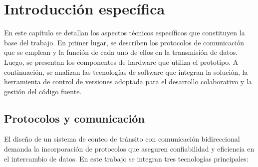 \chapter{Introducción específica} %

\label{Chapter2}

En este capítulo se detallan los aspectos técnicos específicos que constituyen la base del trabajo. En primer lugar, se describen los protocolos de comunicación que se emplean y la función de cada uno de ellos en la transmisión de datos. Luego, se presentan los componentes de hardware que utiliza el prototipo. A continuación, se analizan las tecnologías de software que integran la solución, la herramienta de control de versiones adoptada para el desarrollo colaborativo y la gestión del código fuente.

\section{Protocolos y comunicación}
El diseño de un sistema de conteo de tránsito con comunicación bidireccional demanda la incorporación de protocolos que aseguren confiabilidad y eficiencia en el intercambio de datos. En este trabajo se integran tres tecnologías principales: 

